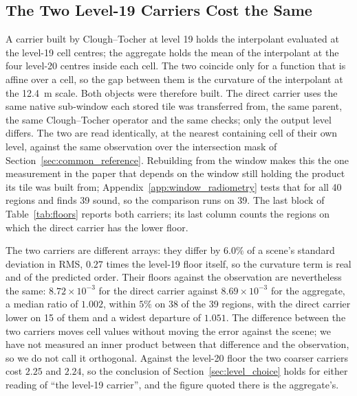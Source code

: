 \subsection{The Two Level-19 Carriers Cost the Same}
\label{sec:level19_direct}

A carrier built by Clough--Tocher at level 19 holds the interpolant
evaluated at the level-19 cell centres; the aggregate holds the mean of
the interpolant at the four level-20 centres inside each cell. The two
coincide only for a function that is affine over a cell, so the gap
between them is the curvature of the interpolant at the \SI{12.4}{m}
scale. Both objects were therefore built. The direct carrier uses the
same native sub-window each stored tile was transferred from, the same
parent, the same Clough--Tocher operator and the same checks; only the
output level differs. The two are read identically, at the nearest
containing cell of their own level, against the same observation over
the intersection mask of Section~\ref{sec:common_reference}. Rebuilding
from the window makes this the one measurement in the paper that depends
on the window still holding the product its tile was built from;
Appendix~\ref{app:window_radiometry} tests that for all 40 regions and
finds 39 sound, so the comparison runs on 39. The last block of
Table~\ref{tab:floors} reports both carriers; its last column counts the
regions on which the direct carrier has the lower floor.

The two carriers are different arrays: they differ by $6.0\%$ of a scene's
standard deviation in RMS, $0.27$ times the level-19 floor itself, so the
curvature term is real and of the predicted order. Their floors against
the observation are nevertheless the same: $8.72\times10^{-3}$ for the
direct carrier against $8.69\times10^{-3}$ for the aggregate, a median
ratio of $1.002$, within $5\%$ on 38 of the 39 regions, with the direct
carrier lower on 15 of them and a widest departure of $1.051$. The
difference between the two carriers moves cell values without moving the
error against the scene; we have not measured an inner product between
that difference and the observation, so we do not call it orthogonal.
Against the level-20 floor the two coarser carriers cost $2.25$ and
$2.24$, so the conclusion of Section~\ref{sec:level_choice} holds for
either reading of ``the level-19 carrier'', and the figure quoted there is
the aggregate's.

